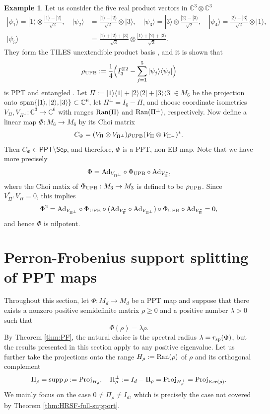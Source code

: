 \documentclass[11pt,reqno]{amsart}
\theoremstyle{definition}
\theoremstyle{definition}
\theoremstyle{definition}
\newtheorem{example}[theorem]{Example}
\theoremstyle{definition}
\newcommand{\la}{\langle}
\newcommand{\ra}{\rangle}
\newcommand{\Comp}{\mathbb{C}}
\newcommand{\Sep}{\mathsf{Sep}}
\newcommand{\ppt}{\mathsf{PPT}}
\newcommand{\Ad}{{\rm Ad}}
\begin{document}
\begin{example} 
Let us consider the five real product vectors in $\Comp^3\otimes\Comp^3$
\begin{align*}
 |\psi_1\ra=|1\ra\otimes\frac{|1\ra-|2\ra}{\sqrt{2}}, \quad |\psi_2\ra&=\frac{|1\ra-|2\ra}{\sqrt{2}}\otimes|3\ra, \quad |\psi_3\ra=|3\ra\otimes\frac{|2\ra-|3\ra}{\sqrt{2}}, \quad |\psi_4\ra=\frac{|2\ra-|3\ra}{\sqrt{2}}\otimes|1\ra,\\
 |\psi_5\ra&=\frac{|1\ra+|2\ra+|3\ra}{\sqrt{3}}
 \otimes\frac{|1\ra+|2\ra+|3\ra}{\sqrt{3}}.
\end{align*}
They form the TILES unextendible product basis \cite{BDMSS99}, and it is shown that
    $$\rho_{\rm UPB} :=\frac{1}{4}\Big(I_3^{\otimes 2}-\sum_{j=1}^5|\psi_j\ra\la \psi_j|\Big)$$
is PPT and entangled . Let $\Pi:=|1\ra\la 1|+|2\ra\la 2| + |3\ra\la 3|\in M_6$ be the projection onto ${\rm span}\{|1\ra,|2\ra,|3\ra\}\subset\Comp^6$, let $\Pi^{\perp}=I_6-\Pi$, and choose coordinate isometries $V_{\Pi},V_{\Pi^{\perp}}:\Comp^3\to\Comp^6$ with ranges ${\rm Ran}(\Pi)$ and ${\rm Ran}(\Pi^{\perp})$, respectively. Now define a linear map $\Phi:M_6\to M_6$ by its Choi matrix
    $$C_{\Phi}=(V_{\Pi}\otimes V_{\Pi^{\perp}})\rho_{\rm UPB}(V_{\Pi}\otimes V_{\Pi^{\perp}})^*.$$
Then $C_{\Phi}\in \ppt\setminus \Sep$, and therefore, $\Phi$ is a PPT, non-EB map. Note that we have more precisely
    $$\Phi = \Ad_{V_{\Pi^{\perp}}} \circ \Phi_{\rm UPB} \circ \Ad_{V_{\Pi}^*},$$
where the Choi matix of $\Phi_{\rm UPB}:M_3\to M_3$ is defined to be $\rho_{\rm UPB}$. Since $V_{\Pi^{\perp}}^* V_{\Pi} = 0$, this implies
    $$\Phi^2 = \Ad_{V_{\Pi^{\perp}}} \circ \Phi_{\rm UPB} \circ (\Ad_{V_{\Pi}^*} \circ \Ad_{V_{\Pi^{\perp}}}) \circ \Phi_{\rm UPB} \circ \Ad_{V_{\Pi}^*} =0,$$
and hence $\Phi$ is nilpotent.
\end{example}


\section{Perron-Frobenius support splitting of PPT maps}\label{sec:splitting}

Throughout this section, let $\Phi:M_d\to M_d$ be a PPT map and suppose that there exists a nonzero positive semidefinite matrix $\rho\geq 0$ and a positive number $\lambda>0$ such that
    $$\Phi(\rho)=\lambda \rho.$$
By Theorem \ref{thm:PF}, the natural choice is the spectral radius $\lambda = r_{\rm sp}(\Phi)$, but the results presented in this section apply to any positive eigenvalue. Let us further take the projections onto the range $H_{\rho}:={\rm Ran}(\rho)$ of $\rho$ and its orthogonal complement
    $$\Pi_{\rho}={\rm supp\,}\rho:={\rm Proj}_{H_{\rho}}, \quad \Pi_{\rho}^{\perp}:=I_d-\Pi_{\rho}= {\rm Proj}_{H_{\rho}^{\perp}} = {\rm Proj}_{{\rm Ker}(\rho)}.$$
We mainly focus on the case $0\neq \Pi_{\rho}\neq I_d$, which is precisely the case not covered by Theorem \ref{thm:HRSF-full-support}.
\end{document}
